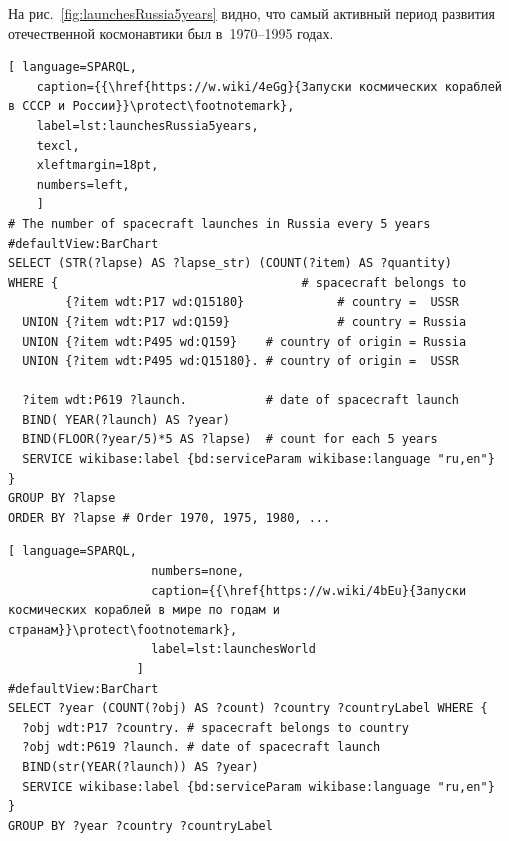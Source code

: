 На рис.~\ref{fig:launchesRussia5years} видно, 
что самый активный период развития отечественной космонавтики был в~1970--1995 годах.



\newpage


\begin{lstlisting}[ language=SPARQL, 
    caption={{\href{https://w.wiki/4eGg}{Запуски космических кораблей в СССР и России}}\protect\footnotemark}, 
    label=lst:launchesRussia5years,
    texcl,
    xleftmargin=18pt, 
    numbers=left,
    ]
# The number of spacecraft launches in Russia every 5 years
#defaultView:BarChart
SELECT (STR(?lapse) AS ?lapse_str) (COUNT(?item) AS ?quantity)
WHERE {                                  # spacecraft belongs to
        {?item wdt:P17 wd:Q15180}             # country =  USSR
  UNION {?item wdt:P17 wd:Q159}               # country = Russia
  UNION {?item wdt:P495 wd:Q159}    # country of origin = Russia
  UNION {?item wdt:P495 wd:Q15180}. # country of origin =  USSR
  
  ?item wdt:P619 ?launch.           # date of spacecraft launch
  BIND( YEAR(?launch) AS ?year) 
  BIND(FLOOR(?year/5)*5 AS ?lapse)  # count for each 5 years
  SERVICE wikibase:label {bd:serviceParam wikibase:language "ru,en"}
} 
GROUP BY ?lapse
ORDER BY ?lapse # Order 1970, 1975, 1980, ...
\end{lstlisting}



\begin{lstlisting}[ language=SPARQL, 
                    numbers=none, 
                    caption={{\href{https://w.wiki/4bEu}{Запуски космических кораблей в мире по годам и странам}}\protect\footnotemark}, 
                    label=lst:launchesWorld
                  ]
#defaultView:BarChart
SELECT ?year (COUNT(?obj) AS ?count) ?country ?countryLabel WHERE {
  ?obj wdt:P17 ?country. # spacecraft belongs to country 
  ?obj wdt:P619 ?launch. # date of spacecraft launch
  BIND(str(YEAR(?launch)) AS ?year)
  SERVICE wikibase:label {bd:serviceParam wikibase:language "ru,en"}
}
GROUP BY ?year ?country ?countryLabel
\end{lstlisting}



